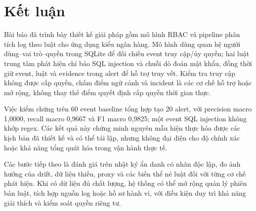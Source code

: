 \section{Kết luận}
\label{sec:conclusion}

Bài báo đã trình bày thiết kế giải pháp gồm mô hình RBAC và pipeline phân tích
log theo luật cho ứng dụng kiểu ngân hàng. Mô hình dùng quan hệ người dùng--vai
trò--quyền trong SQLite để đối chiếu event truy cập/ủy quyền; hai luật trung tâm
phát hiện chỉ báo SQL injection và chuỗi dò đoán mật khẩu, đồng thời giữ event,
luật và evidence trong alert để hỗ trợ truy vết. Kiểm tra truy cập không được
cấp quyền, chấm điểm ngữ cảnh và incident là các cơ chế hỗ trợ hoặc mở rộng, không
thay thế điểm quyết định cấp quyền thời gian thực.

Việc kiểm chứng trên 60 event baseline tổng hợp tạo 20 alert, với precision
macro 1{,}0000, recall macro 0{,}9667 và F1 macro 0{,}9825; một event SQL
injection không khớp regex. Các kết quả này chứng minh nguyên mẫu hiện thực hóa
được các kịch bản đã thiết kế và có thể tái lập, nhưng không đại diện cho độ
chính xác hoặc khả năng tổng quát hóa trong vận hành thực tế.

Các bước tiếp theo là đánh giá trên nhật ký ẩn danh có nhãn độc lập, đo ảnh
hưởng của drift, dữ liệu thiếu, proxy và các biến thể né luật đối với từng cơ
chế phát hiện. Khi có dữ liệu đủ chất lượng, hệ thống có thể mở rộng quản lý
phiên bản luật, tích hợp nguồn log hoặc hồ sơ hành vi, với điều kiện duy trì khả
năng giải thích và kiểm soát quyền riêng tư.

